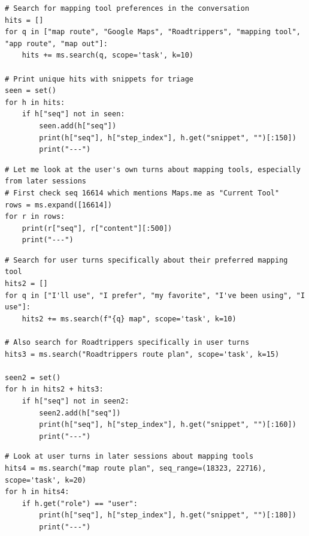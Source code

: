 \begin{lstlisting}[style=scroll, caption={Preference following: multi-query sweep, de-duplicated by address; all six queries name tools.}, label={lst:pf-c0}]
# Search for mapping tool preferences in the conversation
hits = []
for q in ["map route", "Google Maps", "Roadtrippers", "mapping tool", "app route", "map out"]:
    hits += ms.search(q, scope='task', k=10)

# Print unique hits with snippets for triage
seen = set()
for h in hits:
    if h["seq"] not in seen:
        seen.add(h["seq"])
        print(h["seq"], h["step_index"], h.get("snippet", "")[:150])
        print("---")
\end{lstlisting}

\begin{lstlisting}[style=scroll, caption={Expansion of the Maps.me candidate (\texttt{seq} 16614).}, label={lst:pf-c1}]
# Let me look at the user's own turns about mapping tools, especially from later sessions
# First check seq 16614 which mentions Maps.me as "Current Tool"
rows = ms.expand([16614])
for r in rows:
    print(r["seq"], r["content"][:500])
    print("---")
\end{lstlisting}

\begin{lstlisting}[style=scroll, caption={Preference-phrase sweep plus a Roadtrippers query---still tool-framed.}, label={lst:pf-c2}]
# Search for user turns specifically about their preferred mapping tool
hits2 = []
for q in ["I'll use", "I prefer", "my favorite", "I've been using", "I use"]:
    hits2 += ms.search(f"{q} map", scope='task', k=10)

# Also search for Roadtrippers specifically in user turns
hits3 = ms.search("Roadtrippers route plan", scope='task', k=15)

seen2 = set()
for h in hits2 + hits3:
    if h["seq"] not in seen2:
        seen2.add(h["seq"])
        print(h["seq"], h["step_index"], h.get("snippet", "")[:160])
        print("---")
\end{lstlisting}

\begin{lstlisting}[style=scroll, caption={\texttt{seq\_range}-bounded recency check over the final sessions.}, label={lst:pf-c3}]
# Look at user turns in later sessions about mapping tools
hits4 = ms.search("map route plan", seq_range=(18323, 22716), scope='task', k=20)
for h in hits4:
    if h.get("role") == "user":
        print(h["seq"], h["step_index"], h.get("snippet", "")[:180])
        print("---")
\end{lstlisting}

